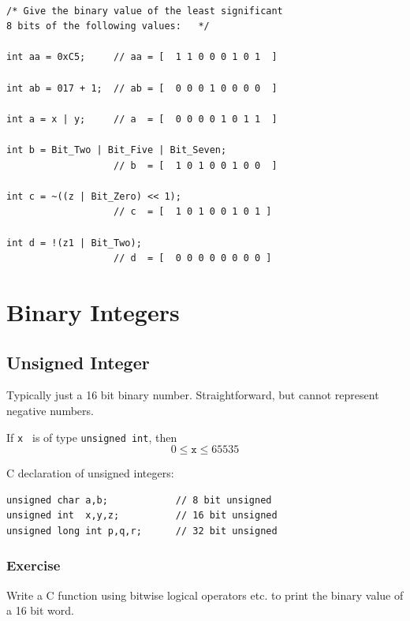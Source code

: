 \documentclass{article}	%
\begin{document}
{\tt
\begin{verbatim}
/* Give the binary value of the least significant
8 bits of the following values:   */

int aa = 0xC5;     // aa = [  1 1 0 0 0 1 0 1  ]

int ab = 017 + 1;  // ab = [  0 0 0 1 0 0 0 0  ]

int a = x | y;     // a  = [  0 0 0 0 1 0 1 1  ]

int b = Bit_Two | Bit_Five | Bit_Seven;
                   // b  = [  1 0 1 0 0 1 0 0  ]

int c = ~((z | Bit_Zero) << 1);
                   // c  = [  1 0 1 0 0 1 0 1 ]

int d = !(z1 | Bit_Two);
                   // d  = [  0 0 0 0 0 0 0 0 ]
\end{verbatim}
}

\newpage	%
\section{Binary Integers}

\subsection{Unsigned Integer}

Typically just a
16 bit binary number.  Straightforward, but cannot represent
negative numbers.

If {\tt x } is of type {\tt unsigned int}, then
\[
0 \leq {\mathtt x} \leq 65535
\]



C declaration of unsigned integers:

\begin{verbatim}
unsigned char a,b;            // 8 bit unsigned
unsigned int  x,y,z;          // 16 bit unsigned
unsigned long int p,q,r;      // 32 bit unsigned
\end{verbatim}




\subsubsection{Exercise}

Write a C function using bitwise logical operators etc. to print
the binary value of a 16 bit word.

\vspace{4in}	%
\end{document}
